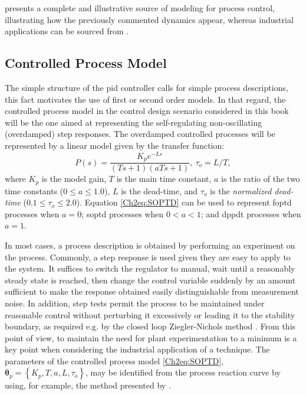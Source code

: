 \citet{MarlinBook} presents a complete and illustrative source of modeling for process control, illustrating how the previously commented dynamics appear, whereas industrial applications can be sourced from \citet{VilanovaBook2012}.
%
\subsection{Controlled Process Model}
\label{sec:2.1}
%
The simple structure of the \gls{pid} controller calls for simple process descriptions, this fact motivates the use of first or second order models. In that regard, the controlled process model in the control design scenario considered in this book will be the one aimed at representing the self-regulating non-oscillating (overdamped) step responses. The overdamped controlled processes will be represented by a linear model given by the transfer function:
%
\begin{equation}
    P(s) = \frac{K_p e^{-Ls}}{(Ts+1)(aTs+1)}, \ \tau_o = L/T, 
    \label{Ch2eq:SOPTD}
\end{equation}
%
where $K_p$ is the model gain, $T$ is the main time constant, $a$ is the ratio of the two time constants ($0 \leq a \leq 1.0$), $L$ is the dead-time, and $\tau_o$ is the \emph{normalized dead-time} ($0.1 \leq \tau_o \leq 2.0$). Equation \eqref{Ch2eq:SOPTD} can be used to represent \gls{foptd} processes when $a=0$; \gls{soptd} processes when $0 < a < 1$; and \gls{dppdt} processes when $a=1$.

In most cases, a process description is obtained by performing an experiment on the process. Commonly,  a step response is used given they are easy to apply to the system. It suffices to switch the regulator to manual, wait until a reasonably steady state is reached, then change the control variable suddenly by an amount sufficient to make the response obtained easily distinguishable from measurement noise. In addition, step tests permit the process to be maintained under reasonable control without perturbing it excessively or leading it to the stability boundary, as required e.g. by the closed loop Ziegler-Nichols method \citep{astromhagglund2006}. From this point of view, to maintain the need for plant experimentation to a minimum is a key point when considering the industrial application of a technique. The parameters of the controlled process model \eqref{Ch2eq:SOPTD}, $\mathbf{\theta}_p = \left\{K_p, T, a, L, \tau_o \right\}$, may be identified from the process reaction curve by using, for example, the method presented by \citet{alfaro2006-1}. 

